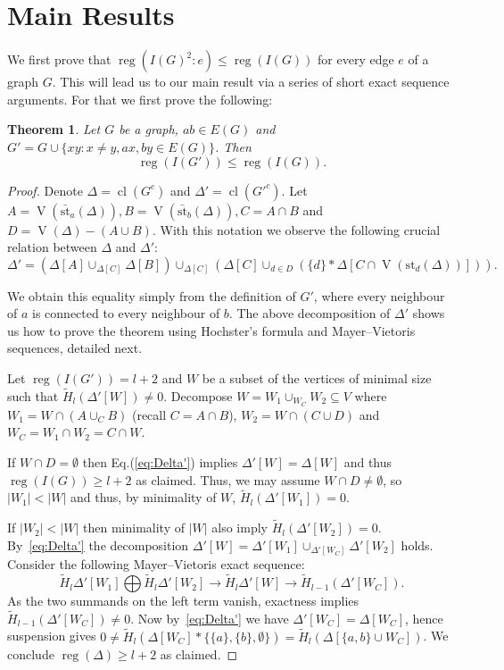 \documentclass[10pt]{article}
\newtheorem{theorem}{Theorem}[section]
\theoremstyle{definition}
\numberwithin{equation}{section}
\newcommand \reg{\operatorname{reg}}
\newcommand \Vr{\operatorname{V}}
\newcommand \cl{\operatorname{cl}}
\newcommand \St{\text{st}}
\begin{document}
\section{Main Results}\label{sec:main_results}
 We first prove that $\reg(I(G)^2:e) \leq \reg(I(G))$ for every edge $e$ of a graph $G$. This will lead us to our main result via a series of short exact sequence arguments. For that we first prove the following:

\begin{theorem}\label{thm:reg(D')}
Let $G$ be a graph, $ab \in E(G)$ and $G'=G \cup \{xy: x\neq y,  ax,by \in E(G)\}$. Then
 $$\reg (I(G') ) \leq \reg(I(G)).$$
\end{theorem}

\begin{proof}
Denote $\Delta=\cl(G^c)$ and $\Delta'=\cl(G'^c)$.
Let $A=\Vr(\bar{\St}_a (\Delta)),B=\Vr(\bar{\St}_b(\Delta)), C=A\cap B$ and $D=\Vr(\Delta)-(A\cup B)$. With this notation we observe the following crucial relation between $\Delta$ and $\Delta'$:
\begin{equation}\label{eq:Delta'}
 \Delta'=(\Delta[A]\cup_{\Delta[C]} \Delta[B])\cup_{\Delta[C]} (\Delta[C] \cup_{d\in D} (\{d\}*\Delta[C \cap \Vr(\St_d (\Delta))])).
\end{equation}

 We obtain this equality simply from the definition of $G'$, where every neighbour of $a$ is connected to every neighbour of $b$.
 The above decomposition of $\Delta'$ shows us how to prove the theorem using Hochster's formula and Mayer--Vietoris sequences, detailed next.


 Let $\reg(I(G')) = l+2$ and $W$ be a subset of the vertices of minimal size such that $\widetilde{H}_l (\Delta'[W]) \neq 0$.
 Decompose $W=W_1 \cup_{W_C} W_2 \subseteq V$ where $W_1=W\cap(A\cup_C B)$ (recall $C=A\cap B$), $W_2=W\cap(C\cup D)$ and $W_C=W_1\cap W_2=C \cap W$.

If $W\cap D=\emptyset$ then Eq.(\ref{eq:Delta'}) implies $\Delta'[W]=\Delta[W]$ and thus $\reg(I(G))\ge l+2$ as claimed.
Thus, we may assume
$W\cap D\neq \emptyset$, so $|W_1|<|W|$ and thus, by minimality of $W$, $\widetilde{H}_l(\Delta'[W_1])=0$.

If $|W_2|<|W|$ then minimality of $|W|$ also imply $\widetilde{H}_l(\Delta'[W_2])=0$.
By~\eqref{eq:Delta'} the decomposition $\Delta'[W]=\Delta'[W_1] \cup_{\Delta'[W_C]} \Delta'[W_2]$ holds. Consider the following Mayer--Vietoris exact sequence: $$\widetilde{H}_l \Delta'[W_1] \bigoplus \widetilde{H}_l \Delta'[W_2] \longrightarrow \widetilde{H}_l \Delta'[W] \longrightarrow \widetilde{H}_{l-1} (\Delta'[W_C]).$$
As the two summands on the left term vanish, exactness implies
$\widetilde{H}_{l-1} (\Delta'[W_C])\neq 0$. 
Now by~\eqref{eq:Delta'} we have  $\Delta'[W_C]=\Delta[W_C]$, hence suspension gives
  $0 \neq \widetilde{H}_l(\Delta[W_C] * \{\{a\},\{b\},\emptyset\})= \widetilde{H}_l(\Delta[\{a,b\} \cup W_C])$.
 We conclude $\reg (\Delta) \geq l+2$ as claimed.


\end{proof}
\end{document}
